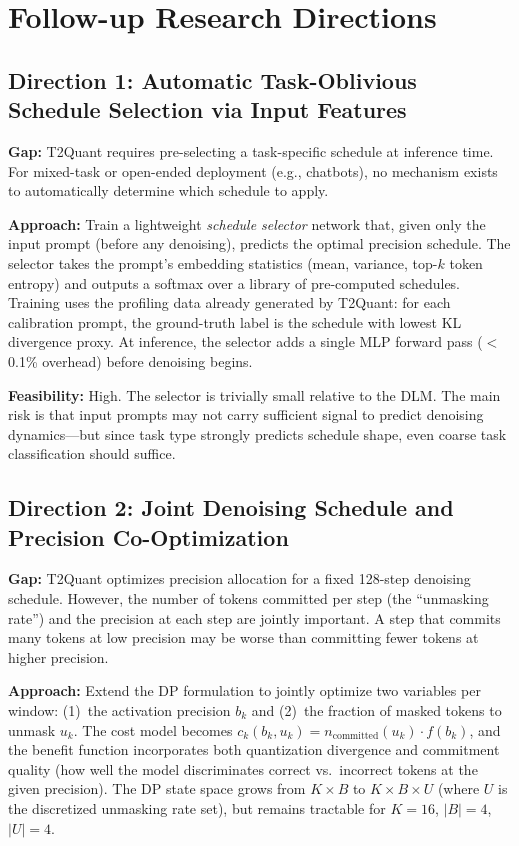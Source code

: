 \documentclass[11pt,a4paper]{article}
\begin{document}
\section{Follow-up Research Directions}

\subsection{Direction 1: Automatic Task-Oblivious Schedule Selection via Input Features}
\textbf{Gap:} T2Quant requires pre-selecting a task-specific schedule at inference time. For mixed-task or open-ended deployment (e.g., chatbots), no mechanism exists to automatically determine which schedule to apply.

\textbf{Approach:} Train a lightweight \emph{schedule selector} network that, given only the input prompt (before any denoising), predicts the optimal precision schedule. The selector takes the prompt's embedding statistics (mean, variance, top-$k$ token entropy) and outputs a softmax over a library of pre-computed schedules. Training uses the profiling data already generated by T2Quant: for each calibration prompt, the ground-truth label is the schedule with lowest KL divergence proxy. At inference, the selector adds a single MLP forward pass ($<$0.1\% overhead) before denoising begins.

\textbf{Feasibility:} High. The selector is trivially small relative to the DLM. The main risk is that input prompts may not carry sufficient signal to predict denoising dynamics---but since task type strongly predicts schedule shape, even coarse task classification should suffice.

\subsection{Direction 2: Joint Denoising Schedule and Precision Co-Optimization}
\textbf{Gap:} T2Quant optimizes precision allocation for a fixed 128-step denoising schedule. However, the number of tokens committed per step (the ``unmasking rate'') and the precision at each step are jointly important. A step that commits many tokens at low precision may be worse than committing fewer tokens at higher precision.

\textbf{Approach:} Extend the DP formulation to jointly optimize two variables per window: (1)~the activation precision $b_k$ and (2)~the fraction of masked tokens to unmask $u_k$. The cost model becomes $c_k(b_k, u_k) = n_{\text{committed}}(u_k) \cdot f(b_k)$, and the benefit function incorporates both quantization divergence and commitment quality (how well the model discriminates correct vs.\ incorrect tokens at the given precision). The DP state space grows from $K \times B$ to $K \times B \times U$ (where $U$ is the discretized unmasking rate set), but remains tractable for $K=16$, $|B|=4$, $|U|=4$.
\end{document}
